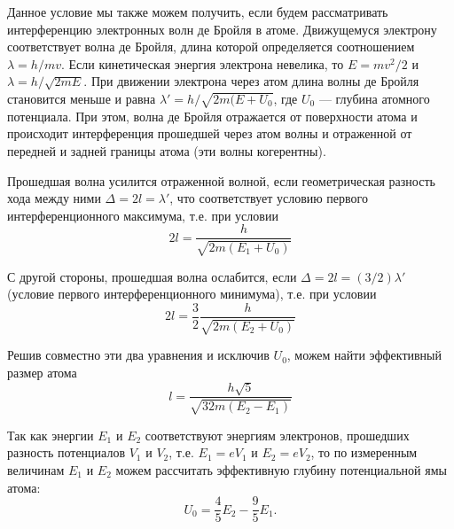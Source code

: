 \documentclass[12pt]{article}
\begin{document}
\par
	Данное условие мы также можем получить, если будем рассматривать интерференцию электронных волн де Бройля в атоме. Движущемуся электрону соответствует волна де Бройля, длина которой определяется соотношением $\lambda = h / mv$. Если кинетическая энергия электрона невелика, то $E = mv^2 / 2$ и $\lambda = h / \sqrt{2mE}$. При движении электрона через атом длина волны де Бройля становится меньше и равна $\lambda' = h / \sqrt{2m (E + U_0}$, где $U_0$ --- глубина атомного потенциала. При этом, волна де Бройля отражается от поверхности атома и происходит интерференция прошедшей через атом волны и отраженной от передней и задней границы атома (эти волны когерентны).
\par
	Прошедшая волна усилится отраженной волной, если геометрическая разность хода между ними $\Delta = 2 l = \lambda'$, что соответствует условию первого интерференционного максимума, т.е. при условии
\[
	2 l = \frac{h}{\sqrt{2m (E_1 + U_0)}}
\] 
\par
	С другой стороны, прошедшая волна ослабится, если $\Delta = 2l = (3/2)\lambda'$ (условие первого интерференционного минимума), т.е. при условии
\[
	2 l = \frac{3}{2} \frac{h}{\sqrt{2m (E_2 + U_0)}}
\]
\par
	Решив совместно эти два уравнения и исключив $U_0$, можем найти эффективный размер атома
\begin{equation}
	 l = \frac{h \sqrt{5}}{\sqrt{32 m (E_2 - E_1)}}
\end{equation}
\par
	Так как энергии $E_1$ и $E_2$ соответствуют энергиям электронов, прошедших разность потенциалов $V_1$ и $V_2$, т.е. $E_1 = e V_1$ и $E_2 = e V_2$, то по измеренным величинам $E_1$ и $E_2$ можем рассчитать эффективную глубину потенциальной ямы атома:
\[
	U_0 = \frac{4}{5} E_2 - \frac{9}{5} E_1.
\]
\end{document}
